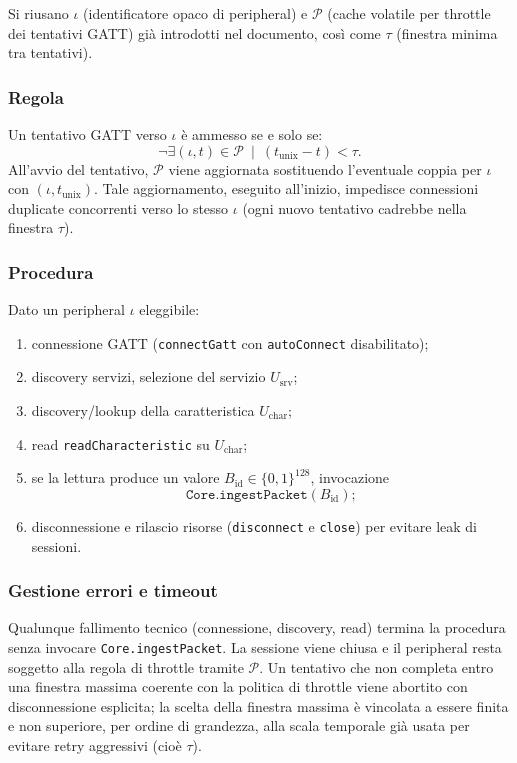 \documentclass[a4paper,11pt,table,dvipsnames]{article}
\begin{document}
Si riusano \(\iota\) (identificatore opaco di peripheral) e \(\mathcal{P}\) (cache volatile per throttle dei tentativi GATT) già introdotti nel documento, così come \(\tau\) (finestra minima tra tentativi).

\subsubsection{Regola}
Un tentativo GATT verso \(\iota\) è ammesso se e solo se:
\[
    \neg \exists(\iota,t)\in\mathcal{P}\ \mid\ (t_{\text{unix}}-t)<\tau.
\]
All’avvio del tentativo, \(\mathcal{P}\) viene aggiornata sostituendo l’eventuale coppia per \(\iota\) con \((\iota,t_{\text{unix}})\). Tale aggiornamento, eseguito all’inizio, impedisce connessioni duplicate concorrenti verso lo stesso \(\iota\) (ogni nuovo tentativo cadrebbe nella finestra \(\tau\)).

\subsubsection{Procedura}
Dato un peripheral \(\iota\) eleggibile:
\begin{enumerate}
    \item connessione GATT (\texttt{connectGatt} con \texttt{autoConnect} disabilitato);
    \item discovery servizi, selezione del servizio \(U_{\text{srv}}\);
    \item discovery/lookup della caratteristica \(U_{\text{char}}\);
    \item read \texttt{readCharacteristic} su \(U_{\text{char}}\);
    \item se la lettura produce un valore \(B_{\text{id}}\in\{0,1\}^{128}\), invocazione
          \[
              \texttt{Core.ingestPacket}(B_{\text{id}});
          \]
    \item disconnessione e rilascio risorse (\texttt{disconnect} e \texttt{close}) per evitare leak di sessioni.
\end{enumerate}

\subsubsection{Gestione errori e timeout}
Qualunque fallimento tecnico (connessione, discovery, read) termina la procedura senza invocare \texttt{Core.ingestPacket}. La sessione viene chiusa e il peripheral resta soggetto alla regola di throttle tramite \(\mathcal{P}\).
Un tentativo che non completa entro una finestra massima coerente con la politica di throttle viene abortito con disconnessione esplicita; la scelta della finestra massima è vincolata a essere finita e non superiore, per ordine di grandezza, alla scala temporale già usata per evitare retry aggressivi (cioè \(\tau\)).
\end{document}
